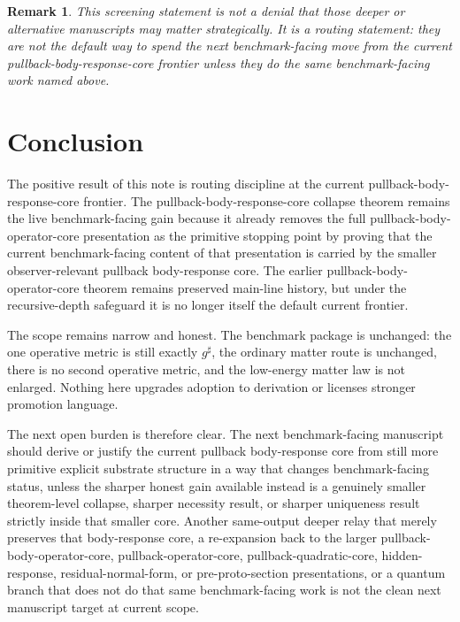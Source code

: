 \documentclass[11pt]{article}
\newcommand{\CompletedMetric}{g^{\sharp}}
\newtheorem{remark}{Remark}
\begin{document}
\begin{remark}
This screening statement is not a denial that those deeper or alternative manuscripts may matter strategically. It is a routing statement: they are not the default way to spend the next benchmark-facing move from the current pullback-body-response-core frontier unless they do the same benchmark-facing work named above.
\end{remark}

\section{Conclusion}

The positive result of this note is routing discipline at the current pullback-body-response-core frontier. The pullback-body-response-core collapse theorem remains the live benchmark-facing gain because it already removes the full pullback-body-operator-core presentation as the primitive stopping point by proving that the current benchmark-facing content of that presentation is carried by the smaller observer-relevant pullback body-response core. The earlier pullback-body-operator-core theorem remains preserved main-line history, but under the recursive-depth safeguard it is no longer itself the default current frontier.

The scope remains narrow and honest. The benchmark package is unchanged: the one operative metric is still exactly \(\CompletedMetric\), the ordinary matter route is unchanged, there is no second operative metric, and the low-energy matter law is not enlarged. Nothing here upgrades adoption to derivation or licenses stronger promotion language.

The next open burden is therefore clear. The next benchmark-facing manuscript should derive or justify the current pullback body-response core from still more primitive explicit substrate structure in a way that changes benchmark-facing status, unless the sharper honest gain available instead is a genuinely smaller theorem-level collapse, sharper necessity result, or sharper uniqueness result strictly inside that smaller core. Another same-output deeper relay that merely preserves that body-response core, a re-expansion back to the larger pullback-body-operator-core, pullback-operator-core, pullback-quadratic-core, hidden-response, residual-normal-form, or pre-proto-section presentations, or a quantum branch that does not do that same benchmark-facing work is not the clean next manuscript target at current scope.
\end{document}
